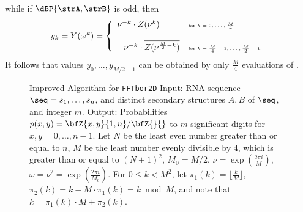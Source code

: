 while if $\dBP{\strA,\strB}$ is odd, then
\begin{align}
\label{eqn:trickyRootsOfUnity2}
y_k = Y(\omega^k) = \left\{
\begin{array}{ll}
\nu^{-k} \cdot Z(\nu^k) &\mbox{\tiny for $k=0,\ldots,\frac{M}{4}$}\\
\quad & \quad\\
-\nu^{-k} \cdot \overline{Z(\nu^{\frac{M}{2}-k})} &\mbox{\tiny for $k=\frac{M}{4}+1,\ldots,\frac{M}{2}-1$.}\\
\end{array} \right.
\end{align}
It follows that values $y_0,\ldots,y_{M/2-1}$ can be obtained by only
$\frac{M}{4}$ evaluations of \emZ{}.


\begin{figure}[!h]
\begin{small}
{\sc Improved Algorithm} for {\tt FFTbor2D}\hfill\break
{\sc Input:} RNA sequence $\seq=s_1,\ldots,s_n$, and distinct secondary
structures $A,B$ of $\seq$, and integer $m$. \hfill\break
{\sc Output:} Probabilities $p(x,y)=\bfZ{x,y}{1,n}/\bfZ{}{}$
to $m$ significant digits for $x,y=0,\ldots,n-1$.
Let $N$ be the least even number greater than or equal
to $n$, $M$ be the least number evenly divisible by $4$, which is greater than
or equal to $(N+1)^2$, $M_0=M/2$, $\nu = \exp(\frac{2\pi i}{M})$,
$\omega=\nu^2= \exp(\frac{2\pi i}{M_0})$. For $0 \leq k < M^2$, let
$\pi_1(k) = \lfloor \frac{k}{M} \rfloor$,
$\pi_2(k) = k - M \cdot \pi_1(k) = k \bmod M$, and note that
$k=\pi_1(k)\cdot M + \pi_2(k)$.
\end{small}
\hfill\break
\smallskip
\begin{small}

\end{small}
\end{figure}
